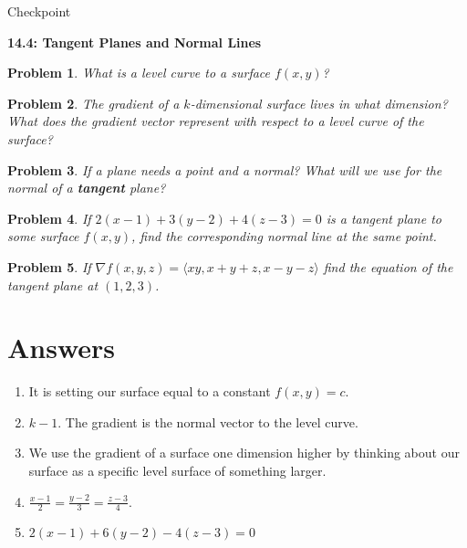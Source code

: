 \documentclass[11pt]{article}
\newtheorem{problem}{Problem}
\newcommand{\vs}{\vspace*{.1in}}
\begin{document}
\begin{huge}
    \begin{center}
        Checkpoint
    \end{center}
\end{huge}
\begin{large}\begin{center}\bf 14.4: Tangent Planes and Normal Lines \end{center}
\end{large}

\vs\vs

\begin{problem}
What is a level curve to a surface $f(x,y)$?
\end{problem}

\begin{problem}
The gradient of a $k$-dimensional surface lives in what dimension? What does the gradient vector represent with respect to a level curve of the surface?
\end{problem}

\begin{problem}
If a plane needs a point and a normal? What will we use for the normal of a \textbf{tangent} plane?
\end{problem}


\begin{problem}
If $2(x-1)+3(y-2)+4(z-3)=0$ is a tangent plane to some surface $f(x,y)$, find the corresponding normal line at the same point.  
\end{problem}

\begin{problem}
If $\nabla f(x,y,z) = \langle xy, x+y+z,x-y-z\rangle$ find the equation of the tangent plane at $(1,2,3)$.
\end{problem}




\newpage

\section{Answers}

\begin{enumerate}
    \item It is setting our surface equal to a constant $f(x,y) = c$.
    \item $k-1$. The gradient is the normal vector to the level curve.
    \item We use the gradient of a surface one dimension higher by thinking about our surface as a specific level surface of something larger.
    \item $\frac{x-1}{2}= \frac{y-2}{3}= \frac{z-3}{4}$.
    \item $2(x-1)+6(y-2)-4(z-3)=0$
\end{enumerate}
\end{document}
